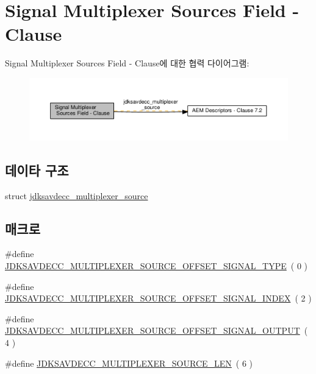 \hypertarget{group__multiplexer__source}{}\section{Signal Multiplexer Sources Field -\/ Clause}
\label{group__multiplexer__source}
Signal Multiplexer Sources Field -\/ Clause에 대한 협력 다이어그램\+:
\nopagebreak
\begin{figure}[H]
\begin{center}
\leavevmode
\includegraphics[width=350pt]{group__multiplexer__source}
\end{center}
\end{figure}
\subsection*{데이타 구조}
\begin{DoxyCompactItemize}
\item 
struct \hyperlink{structjdksavdecc__multiplexer__source}{jdksavdecc\+\_\+multiplexer\+\_\+source}
\end{DoxyCompactItemize}
\subsection*{매크로}
\begin{DoxyCompactItemize}
\item 
\#define \hyperlink{group__multiplexer__source_ga742ab0203ece35acc7dd3e02574e476e}{J\+D\+K\+S\+A\+V\+D\+E\+C\+C\+\_\+\+M\+U\+L\+T\+I\+P\+L\+E\+X\+E\+R\+\_\+\+S\+O\+U\+R\+C\+E\+\_\+\+O\+F\+F\+S\+E\+T\+\_\+\+S\+I\+G\+N\+A\+L\+\_\+\+T\+Y\+PE}~( 0 )
\item 
\#define \hyperlink{group__multiplexer__source_ga8040f79fd2c50314b06d168000902e78}{J\+D\+K\+S\+A\+V\+D\+E\+C\+C\+\_\+\+M\+U\+L\+T\+I\+P\+L\+E\+X\+E\+R\+\_\+\+S\+O\+U\+R\+C\+E\+\_\+\+O\+F\+F\+S\+E\+T\+\_\+\+S\+I\+G\+N\+A\+L\+\_\+\+I\+N\+D\+EX}~( 2 )
\item 
\#define \hyperlink{group__multiplexer__source_gaf5b1ff507295023362f8126d473097a9}{J\+D\+K\+S\+A\+V\+D\+E\+C\+C\+\_\+\+M\+U\+L\+T\+I\+P\+L\+E\+X\+E\+R\+\_\+\+S\+O\+U\+R\+C\+E\+\_\+\+O\+F\+F\+S\+E\+T\+\_\+\+S\+I\+G\+N\+A\+L\+\_\+\+O\+U\+T\+P\+UT}~( 4 )
\item 
\#define \hyperlink{group__multiplexer__source_ga2b5266f126df6f8fc637041ef905aded}{J\+D\+K\+S\+A\+V\+D\+E\+C\+C\+\_\+\+M\+U\+L\+T\+I\+P\+L\+E\+X\+E\+R\+\_\+\+S\+O\+U\+R\+C\+E\+\_\+\+L\+EN}~( 6 )
\end{DoxyCompactItemize}
